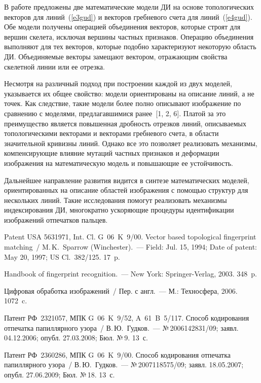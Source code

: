 \begin{multicols}{2}
В работе предложены две математические модели ДИ на основе топологических векторов для
линий~(\ref{e3gud}) и векторов гребневого счета для линий~(\ref{e4gud}). Обе модели получены
операцией объединения векторов, которые строят для вершин скелета, исключая вершины
частных признаков. Операцию объединения выполняют для тех векторов, которые подобно
характеризуют некоторую область ДИ. Объединяемые векторы замещают вектором,
отражающим свойства скелетной линии или ее отрезка.

Несмотря на различный подход при по\-стро\-ении каждой из двух моделей, указывается их общее
свойство: модели ориентированы на описание линий, а не точек. Как следствие, такие модели
более полно описывают изображение по сравнению с моделями, предлагавшимися
ранее~[1, 2, 6]. Платой за это преимущество является повышенная дробность
отрезков линий, описываемых топологическими векторами и векторами гребневого счета, в
области значительной кривизны линий. Однако все это позволяет реализовать механизмы,
компенсирующие влияние мутаций частных признаков и деформации изображения на
математическую модель и повышающие ее устойчивость.

Дальнейшее направление развития видится в синтезе математических моделей, ориентированных
на описание областей изображения с помощью структур для нескольких линий. Такие
исследования помогут реализовать механизмы индексирования ДИ, многократно ускоряющие
процедуры идентификации изображений отпечатков пальцев.

{\small\frenchspacing
{%
\begin{thebibliography}{9}
Patent  USA 5631971, Int. Cl. G~06~K~9/00. Vector based topological fingerprint matching~/
M.\,K.~Sparrow (Winchester).~--- Field: Jul. 15, 1994; Date of patent: May 20, 1997; US Cl.~382/125.
17~p.

Handbook of fingerprint recognition.~--- New York: Springer-Verlag, 2003.  348~p.

Цифровая обработка изображений~/ Пер. с англ.~--- М.: Техносфера, 2006. 1072~c.

Патент РФ~2321057, МПК G~06~K~9/52, A~61~B~5/117. Способ кодирования
отпечатка папиллярного узора~/ В.\,Ю.~Гудков.~--- №\,2006142831/09; заявл. 04.12.2006; опубл.
27.03.2008; Бюл. №\,9. 13~с.

Патент РФ~2360286, МПК G~06~K~9/00. Способ кодирования отпечатка
папиллярного узора~/ В.\,Ю.~Гудков.~--- №\,2007118575/09; заявл. 18.05.2007; опубл. 27.06.2009;
Бюл. №\,18.  13~с.


\end{thebibliography}}}
\end{multicols}
